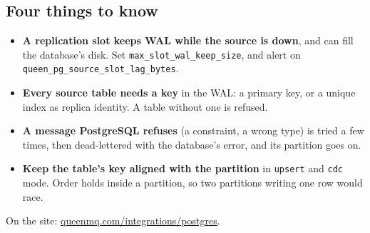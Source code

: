 \subsection{Four things to know}

\begin{itemize}
\item \textbf{A replication slot keeps WAL while the source is down}, and can fill the database's
disk. Set \texttt{max\_slot\_wal\_keep\_size}, and alert on \texttt{queen\_pg\_source\_slot\_lag\_bytes}.
\item \textbf{Every source table needs a key} in the WAL: a primary key, or a unique index as
replica identity. A table without one is refused.
\item \textbf{A message PostgreSQL refuses} (a constraint, a wrong type) is tried a few times, then
dead-lettered with the database's error, and its partition goes on.
\item \textbf{Keep the table's key aligned with the partition} in \texttt{upsert} and \texttt{cdc}
mode. Order holds inside a partition, so two partitions writing one row would race.
\end{itemize}

On the site: \href{https://queenmq.com/integrations/postgres/}{queenmq.com/integrations/postgres}.
